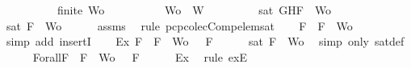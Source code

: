 \begin{isabellebody}
\ \ \ \ \ \ \ \ \ \ {\isachardoublequoteopen}finite\ Wo{\isachardoublequoteclose}\isanewline
\ \ \ \ \ \ \ \ \ \ {\isachardoublequoteopen}Wo\ {\isasymsubseteq}\ W{\isachardoublequoteclose}\isanewline
\ \ \ \ \ \ \ \ \ {\isachardoublequoteopen}sat\ {\isacharparenleft}{\isacharbraceleft}G{\isacharcomma}H{\isacharcomma}F{\isacharbraceright}\ {\isasymunion}\ Wo{\isacharparenright}{\isachardoublequoteclose}\isanewline
%
\isadelimproof
%
\endisadelimproof
%
\isatagproof
{}\isamarkupfalse%
\ {\isacharminus}\isanewline
\ \ \isamarkupfalse%
\ {\isachardoublequoteopen}sat\ {\isacharparenleft}{\isacharbraceleft}F{\isacharbraceright}\ {\isasymunion}\ Wo{\isacharparenright}{\isachardoublequoteclose}\isanewline
\ \ \ \ \isamarkupfalse%
\ assms{\isacharparenleft}{}{\isacharcomma}{}{\isacharcomma}{}{\isacharcomma}{}{\isacharparenright}\ \isamarkupfalse%
\ {\isacharparenleft}rule\ pcp{\isacharunderscore}colecComp{\isacharunderscore}elem{\isacharunderscore}sat{\isacharparenright}\isanewline
\ \ \isamarkupfalse%
\ {\isachardoublequoteopen}F\ {\isasymin}\ {\isacharbraceleft}F{\isacharbraceright}\ {\isasymunion}\ Wo{\isachardoublequoteclose}\isanewline
\ \ \ \ \isamarkupfalse%
\ {\isacharparenleft}simp\ add{\isacharcolon}\ insertI{}{\isacharparenright}\isanewline
\ \ \isamarkupfalse%
\ Ex{}{\isacharcolon}{\isachardoublequoteopen}{\isasymexists}{\isasymA}{\isachardot}\ {\isasymforall}F\ {\isasymin}\ {\isacharparenleft}{\isacharbraceleft}F{\isacharbraceright}\ {\isasymunion}\ Wo{\isacharparenright}{\isachardot}\ {\isasymA}\ {\isasymTurnstile}\ F{\isachardoublequoteclose}\isanewline
\ \ \ \ \isamarkupfalse%
\ {\isacartoucheopen}sat\ {\isacharparenleft}{\isacharbraceleft}F{\isacharbraceright}\ {\isasymunion}\ Wo{\isacharparenright}{\isacartoucheclose}\ \isamarkupfalse%
\ {\isacharparenleft}simp\ only{\isacharcolon}\ sat{\isacharunderscore}def{\isacharparenright}\isanewline
\ \ \isamarkupfalse%
\ {\isasymA}\ \ Forall{}{\isacharcolon}{\isachardoublequoteopen}{\isasymforall}F\ {\isasymin}\ {\isacharparenleft}{\isacharbraceleft}F{\isacharbraceright}\ {\isasymunion}\ Wo{\isacharparenright}{\isachardot}\ {\isasymA}\ {\isasymTurnstile}\ F{\isachardoublequoteclose}\isanewline
\ \ \ \ \isamarkupfalse%
\ Ex{}\ \isamarkupfalse%
\ {\isacharparenleft}rule\ exE{\isacharparenright}\isanewline

\end{isabellebody}
